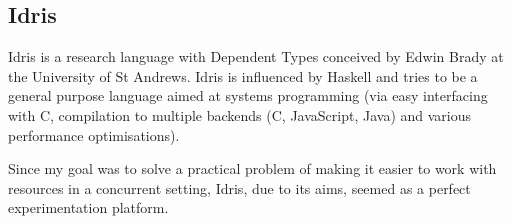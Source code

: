 \subsection{Idris}

Idris is a research language with Dependent Types conceived by Edwin Brady at
the University of St Andrews. Idris is influenced by Haskell and tries to be a
general purpose language aimed at systems programming (via easy interfacing
with C, compilation to multiple backends (C, JavaScript, Java) and various
performance optimisations).

Since my goal was to solve a practical problem of making it easier to work with
resources in a concurrent setting, Idris, due to its aims, seemed as a perfect
experimentation platform.
